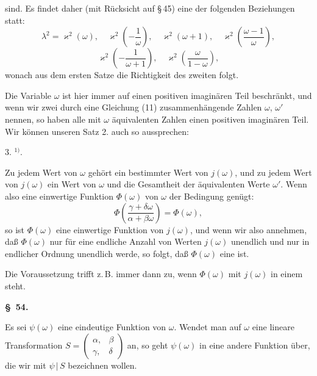 sind. Es findet daher (mit Rücksicht auf \S\,45) eine der folgenden
Beziehungen statt:
\[
\lambda^2 = \varkappa^2(\omega), \quad \varkappa^2\!\left(-\frac{1}{\omega}\right), \quad \varkappa^2(\omega+1), \quad \varkappa^2\!\left(\frac{\omega-1}{\omega}\right),
\]
\[
\varkappa^2\!\left(-\frac{1}{\omega+1}\right), \quad \varkappa^2\!\left(\frac{\omega}{1-\omega}\right),
\]
wonach aus dem ersten Satze die Richtigkeit des zweiten folgt.

Die Variable $\omega$ ist hier immer auf einen positiven imaginären
Teil beschränkt, und wenn wir zwei durch eine Gleichung (11)
zusammenhängende Zahlen $\omega$, $\omega'$  nennen, so haben
alle mit $\omega$ äquivalenten Zahlen einen positiven imaginären Teil.
Wir können unseren Satz 2. auch so aussprechen:

3. $^{1)}$.

Zu jedem Wert von $\omega$ gehört ein bestimmter Wert von $j(\omega)$,
und zu jedem Wert von $j(\omega)$ ein Wert von $\omega$ und die Gesamtheit
 der äquivalenten Werte $\omega'$. Wenn also eine einwertige
Funktion $\Phi(\omega)$ von $\omega$ der Bedingung genügt:
\[
\Phi\!\left(\frac{\gamma+\delta\omega}{\alpha+\beta\omega}\right) = \Phi(\omega),
\]
so ist $\Phi(\omega)$ eine einwertige Funktion von $j(\omega)$, und wenn wir
also annehmen, daß $\Phi(\omega)$ nur für eine endliche Anzahl von
Werten $j(\omega)$ unendlich und nur in endlicher Ordnung unendlich
werde, so folgt, daß $\Phi(\omega)$ eine  ist.

Die Voraussetzung trifft z.\,B. immer dann zu, wenn $\Phi(\omega)$
mit $j(\omega)$ in einem  steht.

\begin{center}
\textbf{\S\ 54. }
\end{center}

Es sei $\psi(\omega)$ eine eindeutige Funktion von $\omega$. Wendet man
auf $\omega$ eine lineare Transformation $S = \begin{pmatrix} \alpha, & \beta \\ \gamma, & \delta \end{pmatrix}$ an, so geht $\psi(\omega)$
in eine andere Funktion
über, die wir mit $\psi\,|\,S$ bezeichnen wollen.

\begingroup
\renewcommand{\thefootnote}{1)}
\endgroup
